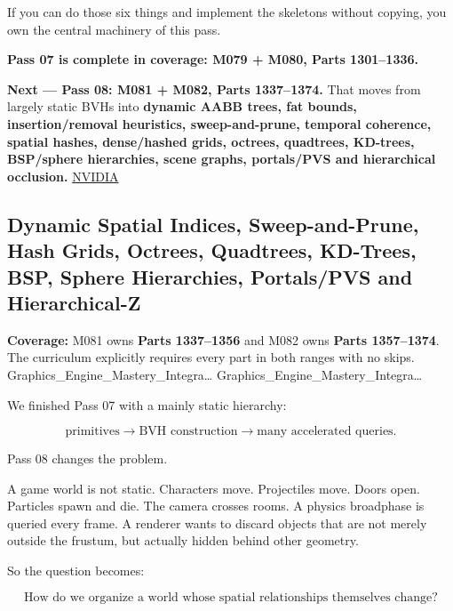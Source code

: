 If you can do those six things and implement the skeletons without copying, you own the central machinery of this pass.

\textbf{Pass 07 is complete in coverage: M079 + M080, Parts 1301--1336.}

\textbf{Next --- Pass 08: M081 + M082, Parts 1337--1374.} That moves from largely static BVHs into \textbf{dynamic AABB trees, fat bounds, insertion/removal heuristics, sweep-and-prune, temporal coherence, spatial hashes, dense/hashed grids, octrees, quadtrees, KD-trees, BSP/sphere hierarchies, scene graphs, portals/PVS and hierarchical occlusion.} \href{https://research.nvidia.com/publication/2012-06_maximizing-parallelism-construction-bvhs-octrees-and-k-d-trees?utm_source=chatgpt.com}{NVIDIA}

\subsection{Dynamic Spatial Indices, Sweep-and-Prune, Hash Grids, Octrees, Quadtrees, KD-Trees, BSP, Sphere Hierarchies, Portals/PVS and Hierarchical-Z}\label{06-engine-ii-ch028-dynamic-spatial-indices-sweep-and-prune-hash-grids-octrees-quadtrees-kd-trees-bsp-sphere-hierarchies-portalspvs-and-hierarchical-z}

\hypertarget{06-engine-ii-ch028-dynamic-spatial-indices-sweep-and-prune-hash-grids-octrees-quadtrees-kd-trees-bsp-sphere-hierarchies-portalspvs-and-hierarchical-z}{}

\textbf{Coverage:} M081 owns \textbf{Parts 1337--1356} and M082 owns \textbf{Parts 1357--1374}. The curriculum explicitly requires every part in both ranges with no skips. Graphics\_Engine\_Mastery\_Integra\ldots{} Graphics\_Engine\_Mastery\_Integra\ldots{}

We finished Pass 07 with a mainly static hierarchy:

\[
\text{primitives}
\rightarrow
\text{BVH construction}
\rightarrow
\text{many accelerated queries}.
\]

Pass 08 changes the problem.

A game world is not static. Characters move. Projectiles move. Doors open. Particles spawn and die. The camera crosses rooms. A physics broadphase is queried every frame. A renderer wants to discard objects that are not merely outside the frustum, but actually hidden behind other geometry.

So the question becomes:

\[
\boxed{
\text{How do we organize a world whose spatial relationships themselves change?}
}
\]

